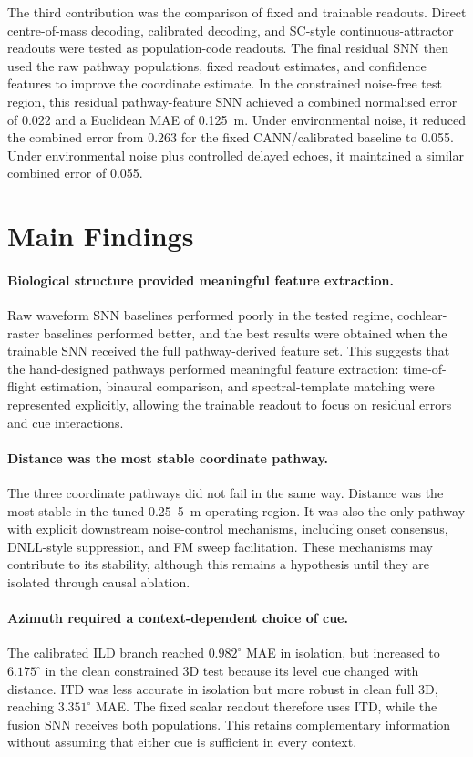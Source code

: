 The third contribution was the comparison of fixed and trainable readouts. Direct centre-of-mass decoding, calibrated decoding, and SC-style continuous-attractor readouts were tested as population-code readouts. The final residual SNN then used the raw pathway populations, fixed readout estimates, and confidence features to improve the coordinate estimate. In the constrained noise-free test region, this residual pathway-feature SNN achieved a combined normalised error of 0.022 and a Euclidean MAE of 0.125~m. Under environmental noise, it reduced the combined error from 0.263 for the fixed CANN/calibrated baseline to 0.055. Under environmental noise plus controlled delayed echoes, it maintained a similar combined error of 0.055.

\section{Main Findings}

\paragraph{Biological structure provided meaningful feature extraction.} Raw waveform SNN baselines performed poorly in the tested regime, cochlear-raster baselines performed better, and the best results were obtained when the trainable SNN received the full pathway-derived feature set. This suggests that the hand-designed pathways performed meaningful feature extraction: time-of-flight estimation, binaural comparison, and spectral-template matching were represented explicitly, allowing the trainable readout to focus on residual errors and cue interactions.

\paragraph{Distance was the most stable coordinate pathway.} The three coordinate pathways did not fail in the same way. Distance was the most stable in the tuned 0.25--5~m operating region. It was also the only pathway with explicit downstream noise-control mechanisms, including onset consensus, DNLL-style suppression, and FM sweep facilitation. These mechanisms may contribute to its stability, although this remains a hypothesis until they are isolated through causal ablation.

\paragraph{Azimuth required a context-dependent choice of cue.} The calibrated ILD branch reached $0.982^\circ$ MAE in isolation, but increased to $6.175^\circ$ in the clean constrained 3D test because its level cue changed with distance. ITD was less accurate in isolation but more robust in clean full 3D, reaching $3.351^\circ$ MAE. The fixed scalar readout therefore uses ITD, while the fusion SNN receives both populations. This retains complementary information without assuming that either cue is sufficient in every context.

